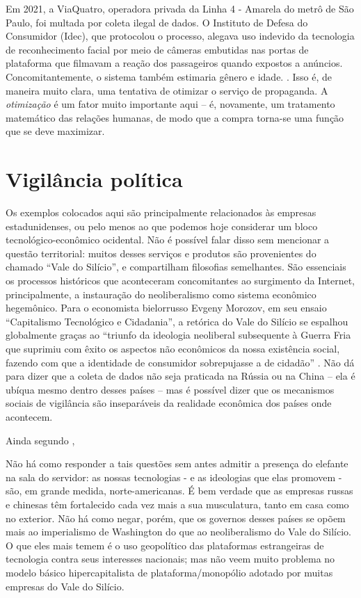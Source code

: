 Em 2021, a ViaQuatro, operadora privada da Linha 4 - Amarela do metrô de São Paulo, foi multada por coleta ilegal de dados.
O Instituto de Defesa do Consumidor (Idec), que protocolou o processo, alegava uso indevido da tecnologia de reconhecimento facial por meio de câmeras embutidas nas portas de plataforma que filmavam a reação dos passageiros quando expostos a anúncios.
Concomitantemente, o sistema também estimaria gênero e idade.
\cite{soprana_viaquatro_2021}.
Isso é, de maneira muito clara, uma tentativa de otimizar o serviço de propaganda.
A \textit{otimização} é um fator muito importante aqui -- é, novamente, um tratamento matemático das relações humanas, de modo que a compra torna-se uma função que se deve maximizar.

\section{Vigilância política}

Os exemplos colocados aqui são principalmente relacionados às empresas estadunidenses, ou pelo menos ao que podemos hoje considerar um bloco tecnológico-econômico ocidental.
Não é possível falar disso sem mencionar a questão territorial: muitos desses serviços e produtos são provenientes do chamado ``Vale do Silício'', e compartilham filosofias semelhantes.
São essenciais os processos históricos que aconteceram concomitantes ao surgimento da Internet, principalmente, a instauração do neoliberalismo como sistema econômico hegemônico.
Para o economista bielorrusso Evgeny Morozov, em seu ensaio ``Capitalismo Tecnológico e Cidadania'', a retórica do Vale do Silício se espalhou globalmente graças ao ``triunfo da ideologia neoliberal subsequente à Guerra Fria que suprimiu com êxito os aspectos não econômicos da nossa existência social, fazendo com que a identidade de consumidor sobrepujasse a de cidadão'' \cite[p.~19]{morozov_big_2018}.
Não dá para dizer que a coleta de dados não seja praticada na Rússia ou na China -- ela é ubíqua mesmo dentro desses países -- mas é possível dizer que os mecanismos sociais de vigilância são inseparáveis da realidade econômica dos países onde acontecem.

Ainda segundo \textcite[p.~15]{morozov_big_2018},

\begin{quoting}
    Não há como responder a tais questões sem antes admitir a presença do elefante na sala do servidor: as nossas tecnologias - e as ideologias que elas promovem - são, em grande medida, norte-americanas. 
    É bem verdade que as empresas russas e chinesas têm fortalecido cada vez mais a sua musculatura, tanto em casa como no exterior. 
    Não há como negar, porém, que os governos desses países se opõem mais ao imperialismo de Washington do que ao neoliberalismo do Vale do Silício. 
    O que eles mais temem é o uso geopolítico das plataformas estrangeiras de tecnologia contra seus interesses nacionais; mas não veem muito problema no modelo básico hipercapitalista de plataforma/monopólio adotado por muitas empresas do Vale do Silício. 
\end{quoting}


